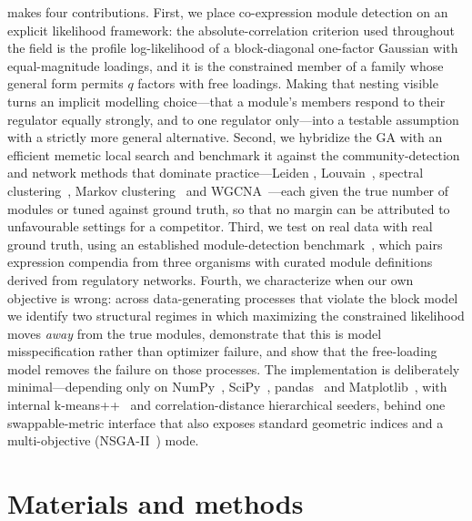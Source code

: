 \tool{} makes four contributions. First, we place co-expression module detection
on an explicit likelihood framework: the absolute-correlation criterion used
throughout the field is the profile log-likelihood of a block-diagonal one-factor
Gaussian with equal-magnitude loadings, and it is the constrained member of a
family whose general form permits $q$ factors with free loadings. Making that
nesting visible turns an implicit modelling choice---that a module's members
respond to their regulator equally strongly, and to one regulator only---into a
testable assumption with a strictly more general alternative. Second, we hybridize
the GA with an efficient memetic local search and benchmark it against the
community-detection and network methods that dominate practice---Leiden
\cite{Traag2019}, Louvain~\cite{Blondel2008}, spectral
clustering~\cite{NgJordanWeiss2002}, Markov clustering~\cite{VanDongen2008} and
WGCNA~\cite{Langfelder2008}---each given the true number of modules or tuned
against ground truth, so that no margin can be attributed to unfavourable settings
for a competitor. Third, we test on real data with real ground truth, using an established module-detection benchmark~\cite{Saelens2018}, which pairs expression compendia
from three organisms with curated module definitions derived from regulatory
networks. Fourth, we characterize when our own
objective is wrong: across data-generating processes that violate the block model
we identify two structural regimes in which maximizing the constrained likelihood
moves \emph{away} from the true modules, demonstrate that this is model
misspecification rather than optimizer failure, and show that the free-loading
model removes the failure on those processes. The implementation is deliberately minimal---depending only on NumPy~\cite{Harris2020}, SciPy~\cite{Virtanen2020}, pandas~\cite{McKinney2010} and Matplotlib~\cite{Hunter2007}, with internal
k-means++~\cite{ArthurVassilvitskii2007} and correlation-distance hierarchical
seeders, behind one swappable-metric interface that also exposes standard
geometric indices and a multi-objective (NSGA-II~\cite{Deb2002}) mode.

\section*{Materials and methods}

